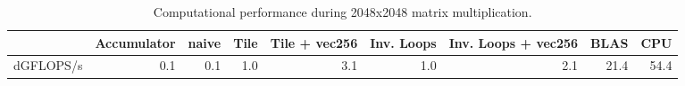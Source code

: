 \begin{table}
\centering
\caption{Computational performance during 2048x2048 matrix multiplication.}
\begin{tabular}{lrrrrrrrr}
\toprule
{} &  Accumulator &  naive &  Tile &  Tile + vec256 &  Inv. Loops &  Inv. Loops + vec256 &  BLAS &  CPU \\
\midrule
dGFLOPS/s &          0.1 &    0.1 &   1.0 &            3.1 &         1.0 &                  2.1 &  21.4 & 54.4 \\
\bottomrule
\end{tabular}
\end{table}
